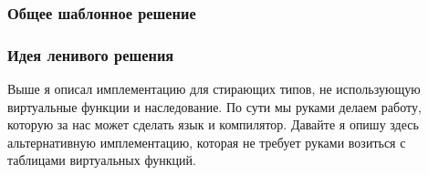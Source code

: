 \subsubsection{Общее шаблонное решение}


\subsubsection{Идея ленивого решения}
Выше я описал имплементацию для стирающих типов, не использующую виртуальные функции и наследование.
По сути мы руками делаем работу, которую за нас может сделать язык и компилятор.
Давайте я опишу здесь альтернативную имплементацию, которая не требует руками возиться с таблицами виртуальных функций.

